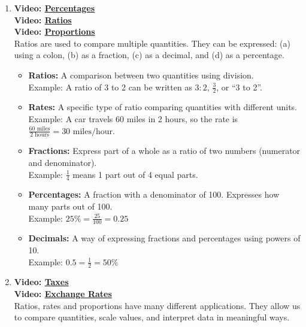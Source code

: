 \documentclass[
]{book}
\providecommand{\tightlist}{%
  \setlength{\itemsep}{0pt}\setlength{\parskip}{0pt}}
\begin{document}
\begin{enumerate}
\def\labelenumi{\arabic{enumi}.}
\tightlist
\item
  \textbf{Video: \href{https://www.youtube.com/watch?v=GU3i-S4sxdw}{Percentages}}\\
  \textbf{Video: \href{https://www.youtube.com/watch?v=Nj1cYFE7cBA}{Ratios}}\\
  \textbf{Video: \href{https://www.youtube.com/watch?v=j4TboDA7cNI}{Proportions}}\\
  Ratios are used to compare multiple quantities. They can be expressed: (a) using a colon, (b) as a fraction, (c) as a decimal, and (d) as a percentage.

  \begin{itemize}
  \tightlist
  \item
    \textbf{Ratios:} A comparison between two quantities using division.\\
    Example: A ratio of 3 to 2 can be written as \(3:2\), \(\frac{3}{2}\), or ``3 to 2''.
  \item
    \textbf{Rates:} A specific type of ratio comparing quantities with different units.\\
    Example: A car travels 60 miles in 2 hours, so the rate is \(\frac{60 \text{ miles}}{2 \text{ hours}} = 30 \text{ miles/hour}\).
  \item
    \textbf{Fractions:} Express part of a whole as a ratio of two numbers (numerator and denominator).\\
    Example: \(\frac{1}{4}\) means 1 part out of 4 equal parts.
  \item
    \textbf{Percentages:} A fraction with a denominator of 100. Expresses how many parts out of 100.\\
    Example: \(25\% = \frac{25}{100} = 0.25\)
  \item
    \textbf{Decimals:} A way of expressing fractions and percentages using powers of 10.\\
    Example: \(0.5 = \frac{1}{2} = 50\%\)
  \end{itemize}
\item
  \textbf{Video: \href{https://www.youtube.com/watch?v=O9YKlxowu68}{Taxes}}\\
  \textbf{Video: \href{https://www.youtube.com/watch?v=ChgppEgOYc0}{Exchange Rates}}\\
  Ratios, rates and proportions have many different applications. They allow us to compare quantities, scale values, and interpret data in meaningful ways.


\end{enumerate}
\end{document}
